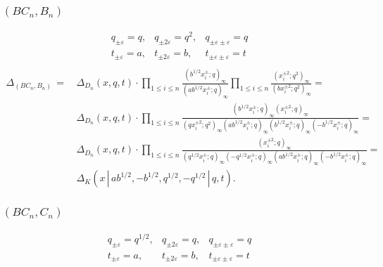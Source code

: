 \documentclass{article}
\def\nn{\nonumber}
\def\nn{\nonumber}
\def\ep{\varepsilon}
\begin{document}
\subsubsection*{$(BC_n,B_n)$}
\begin{equation}
    \begin{array}{lll}
        q_{\pm \ep} = q, & q_{\pm 2\ep} = q^2, & q_{\pm \ep \pm \ep} = q \\
        t_{\pm \ep} = a, & t_{\pm 2\ep} = b, & t_{\pm \ep \pm \ep} = t \\
    \end{array}
\end{equation}
\begin{align}
    \Delta_{(BC_n, B_n)}\, =\, & \Delta_{D_n}(x,q,t) \cdot \prod_{1\leq i\leq n}\frac{(b^{1/2}x_i^{\pm};q)_{\infty
    }}{(a b^{1/2}x_i^{\pm};q)_{\infty}}
    \prod_{1\leq i\leq n}\frac{(x_i^{\pm 2};q^2)_{\infty
    }}{(b x_i^{\pm 2};q^2)_{\infty}} \nn = \\
    &  \Delta_{D_n}(x,q,t) \cdot \prod_{1\leq i\leq n} \frac{(b^{1/2}x_i^{\pm};q)_{\infty
    } (x_i^{\pm 2};q)_{\infty
    }}{ (q x_i^{\pm 2};q^2)_{\infty
    } (a b^{1/2}x_i^{\pm};q)_{\infty} (b^{1/2}x_i^{\pm};q)_{\infty
    }(-b^{1/2}x_i^{\pm};q)_{\infty
    }} = \nn \\
    &  \Delta_{D_n}(x,q,t) \cdot \prod_{1\leq i\leq n}
    \frac{(x_i^{\pm 2};q)_{\infty}}{ (q^{1/2} x_i^{\pm};q)_{\infty} (-q^{1/2} x_i^{\pm};q)_{\infty} (a b^{1/2}x_i^{\pm};q)_{\infty} (-b^{1/2}x_i^{\pm};q)_{\infty
    }} = \nn \\
    & \boxed{\Delta_K (x \,|\, a b^{1/2}, -b^{1/2}, q^{1/2}, -q^{1/2}\,|\, q,t)}.
\end{align}


\subsubsection*{$(BC_n, C_n)$}

\begin{equation}
    \begin{array}{lll}
        q_{\pm \ep} = q^{1/2}, & q_{\pm 2\ep} = q, & q_{\pm \ep \pm \ep} = q \\
        t_{\pm \ep} = a, & t_{\pm 2\ep} = b, & t_{\pm \ep \pm \ep} = t \\
    \end{array}
\end{equation}
\end{document}
